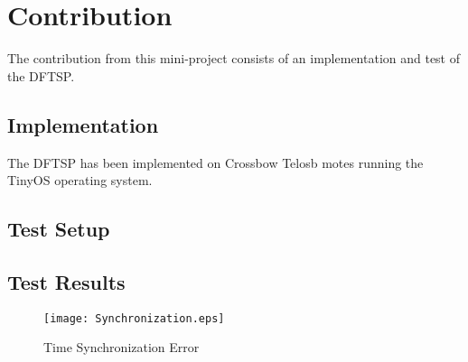 \documentclass[Main]{subfiles}
\begin{document}
\section{Contribution} %
\label{sec:contribution}

	The contribution from this mini-project consists of an implementation and test of the DFTSP.

	\subsection{Implementation} %
	\label{sub:implementation}
		The DFTSP has been implemented on Crossbow Telosb motes\cite{TelosBDatasheet:Online} running the TinyOS\cite{TinyOS:Online} operating system.
	

	\subsection{Test Setup} %
	\label{sub:test_setup}
	

	\subsection{Test Results} %
	\label{sub:test_results}

		\begin{figure}[H]
			\centering
			\texttt{[image: Synchronization.eps]}
			\caption{Time Synchronization Error}
			\label{fig:Synchronization}
		\end{figure}
	

\end{document}
